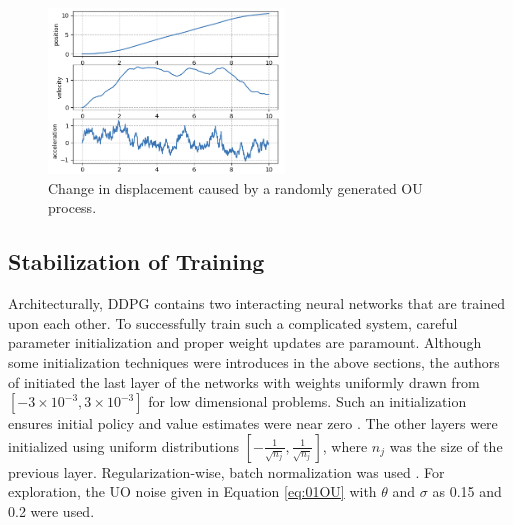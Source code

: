 \begin{figure}[H]
    \centering
    \includegraphics[width=0.56\textwidth]{images/ch1/01OU.jpeg}
    \caption{Change in displacement caused by a randomly generated OU process.}
    \label{fig:01OU}
\end{figure}   


\subsection{Stabilization of Training}
Architecturally, DDPG contains two interacting neural networks that are trained upon each other.  To successfully train such a complicated system, careful parameter initialization and proper weight updates are paramount.  Although some initialization techniques were introduces in the above sections, the authors of \cite{ddpg} initiated the last layer of the networks with weights uniformly drawn from $[-3 \times 10^{-3}, 3 \times 10^{-3}]$ for low dimensional problems. Such an initialization ensures initial policy and value estimates were near zero \cite{ddpg}. The other layers were initialized using uniform distributions $[-\frac{1}{\sqrt{n_j}}, \frac{1}{\sqrt{n_j}}]$, where $n_j$ was the size of the previous layer.  Regularization-wise, batch normalization was used \cite{batch_norm}. For exploration, the UO noise given in Equation \ref{eq:01OU} with $\theta$ and $\sigma$ as 0.15 and 0.2 were used.

